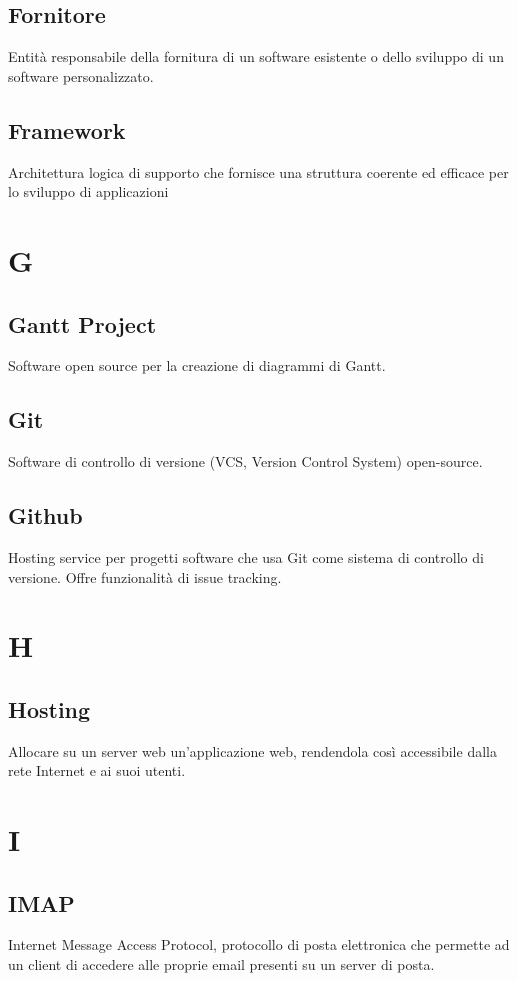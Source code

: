 \documentclass[12pt]{article}
\begin{document}
		\subsection{Fornitore}
		Entità responsabile della fornitura di un software esistente o dello sviluppo di un software personalizzato.
		\subsection{Framework} %
		Architettura logica di supporto che fornisce una struttura coerente ed efficace per lo sviluppo di applicazioni

	\clearpage
	\section{G}
		\subsection{Gantt Project}
		 Software open source per la creazione di diagrammi di Gantt.
		\subsection{Git}
		Software di controllo di versione (VCS, Version Control System) open-source.


		\subsection{Github}
		Hosting service per progetti software che usa Git come sistema di controllo di versione. Offre funzionalità di issue tracking.
	\clearpage
	\section{H}
		\subsection{Hosting}
		Allocare su un server web un'applicazione web, rendendola così accessibile dalla rete Internet e ai suoi utenti.
		
	\clearpage
	\section{I}
		\subsection{IMAP}
		Internet Message Access Protocol, protocollo di posta elettronica che permette ad un client di accedere alle proprie email presenti su un server di posta.
\end{document}
